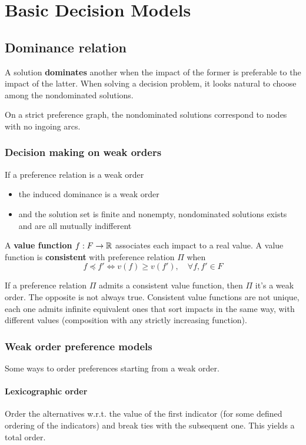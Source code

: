 \section{Basic Decision Models}

\subsection{Dominance relation}

A solution \textbf{dominates} another when the impact of the former is preferable to the impact of the latter. When solving a decision problem, it looks natural to choose among the nondominated solutions. 

On a strict preference graph, the nondominated solutions correspond to nodes with no ingoing arcs. 

\subsubsection{Decision making on weak orders}

If a preference relation is a weak order
\begin{itemize}
	\item the induced dominance is a weak order
	
	\item and the solution set is finite and nonempty, nondominated solutions exists and are all mutually indifferent
\end{itemize}

A \textbf{value function} $f: F \rightarrow \operatorname{\mathbb{R}}$ associates each impact to a real value. A value function is \textbf{consistent} with preference relation $\Pi$ when 
$$ f \preceq f' \Leftrightarrow v(f) \geq v(f'), \quad \forall f,f' \in F$$

If a preference relation $\Pi$ admits a consistent value function, then $\Pi$ it's a weak order. The opposite is not always true. Consistent value functions are not unique, each one admits infinite equivalent ones that sort impacts in the same way, with different values (composition with any strictly increasing function).

\subsubsection{Weak order preference models}

Some ways to order preferences starting from a weak order.

\paragraph{Lexicographic order} Order the alternatives w.r.t. the value of the first indicator (for some defined ordering of the indicators) and break ties with the subsequent one. This yields a total order.

